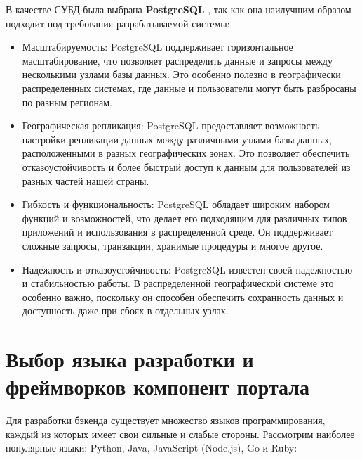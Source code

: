 В качестве СУБД была выбрана \textbf{PostgreSQL} \cite{postgresql}, так как она наилучшим
образом подходит под требования разрабатываемой системы:
\begin{itemize}
	\item Масштабируемость: PostgreSQL поддерживает горизонтальное масштабирование, что позволяет распределить данные и запросы между несколькими узлами базы данных. Это особенно полезно в географически распределенных системах, где данные и пользователи могут быть разбросаны по разным регионам.
	\item Географическая репликация: PostgreSQL предоставляет возможность
настройки репликации данных между различными узлами базы данных, расположенными в разных географических зонах. Это позволяет
обеспечить отказоустойчивость и более быстрый доступ к данным для
пользователей из разных частей нашей страны.
	\item Гибкость и функциональность: PostgreSQL обладает широким набором
функций и возможностей, что делает его подходящим для различных
типов приложений и использования в распределенной среде. Он поддерживает сложные запросы, транзакции, хранимые процедуры и многое
другое.
	\item Надежность и отказоустойчивость: PostgreSQL известен своей надежностью и стабильностью работы. В распределенной географической
системе это особенно важно, поскольку он способен обеспечить сохранность данных и доступность даже при сбоях в отдельных узлах.
\end{itemize}


\section{Выбор языка разработки и фреймворков компонент
портала}

Для разработки бэкенда существует множество языков программирования, каждый из которых имеет свои сильные и слабые стороны. Рассмотрим наиболее популярные языки: Python, Java, JavaScript (Node.js), Go и Ruby:

